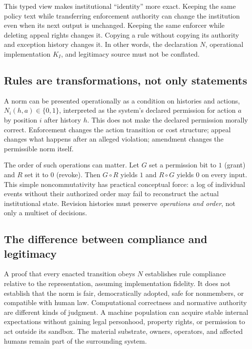 This typed view makes institutional ``identity'' more exact. Keeping the same policy text while transferring enforcement authority can change the institution even when its next output is unchanged. Keeping the same enforcer while deleting appeal rights changes it. Copying a rule without copying its authority and exception history changes it. In other words, the declaration $N$, operational implementation $K_I$, and legitimacy source must not be conflated.

\subsection{Rules are transformations, not only statements}

A norm can be presented operationally as a condition on histories and actions, $N_i(h,a)\in\{0,1\}$, interpreted as the system's declared permission for action $a$ by position $i$ after history $h$. This does not make the declared permission morally correct. Enforcement changes the action transition or cost structure; appeal changes what happens after an alleged violation; amendment changes the permissible norm itself.

The order of such operations can matter. Let $G$ set a permission bit to $1$ (grant) and $R$ set it to $0$ (revoke). Then $G\circ R$ yields $1$ and $R\circ G$ yields $0$ on every input. This simple noncommutativity has practical conceptual force: a log of individual events without their authorized order may fail to reconstruct the actual institutional state. Revision histories must preserve \emph{operations and order}, not only a multiset of decisions.

\subsection{The difference between compliance and legitimacy}

A proof that every enacted transition obeys $N$ establishes rule compliance relative to the representation, assuming implementation fidelity. It does not establish that the norm is fair, democratically adopted, safe for nonmembers, or compatible with human law. Computational correctness and normative authority are different kinds of judgment. A machine population can acquire stable internal expectations without gaining legal personhood, property rights, or permission to act outside its sandbox. The material substrate, owners, operators, and affected humans remain part of the surrounding system.


